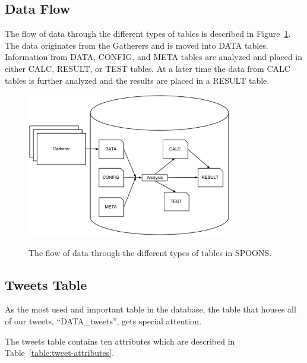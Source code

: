 \documentclass[12pt]{ucthesis}
\newcommand{\captionfonts}{\small\bf\ssp}
\begin{document}
\subsection{Data Flow}
\label{arch-database-data-flow}
The flow of data through the different types of tables is described in Figure~\ref{fig:db-data-flow}.
The data originates from the Gatherers and is moved into DATA tables. Information from
DATA, CONFIG, and META tables are analyzed and placed in either CALC, RESULT, or TEST tables.
At a later time the data from CALC tables is further analyzed and the results are placed in a RESULT table.

\begin{figure}
   \begin{center}
      \includegraphics[width=0.8\textwidth]{images/DB_Data_Flow.eps}
      \captionfonts
      \caption[Database Data Flow]{The flow of data through the different types of tables in SPOONS.}
      \label{fig:db-data-flow}
   \end{center}
\end{figure}

\subsection{Tweets Table}
\label{arch-database-tables-tweets}
As the most used and important table in the database, the table that houses all of our tweets, ``DATA\_tweets'', gets special attention.

The tweets table contains ten attributes which are described in Table~\ref{table:tweet-attributes}.
\end{document}
